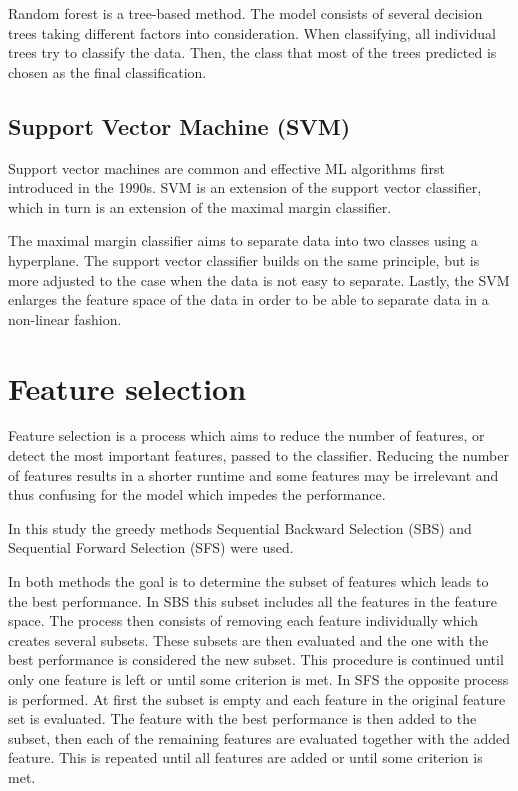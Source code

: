 \documentclass{kththesis}
\begin{document}
Random forest is a tree-based method. The model consists of several decision trees taking different factors into consideration. When classifying, all individual trees try to classify the data. Then, the class that most of the trees predicted is chosen as the final classification. \parencite{ibmrforest}


\subsection{Support Vector Machine (SVM)}

Support vector machines are common and effective ML algorithms first introduced in the 1990s. SVM is an extension of the support vector classifier, which in turn is an extension of the maximal margin classifier.

The maximal margin classifier aims to separate data into two classes using a hyperplane. The support vector classifier builds on the same principle, but is more adjusted to the case when the data is not easy to separate. Lastly, the SVM enlarges the feature space of the data in order to be able to separate data in a non-linear fashion. \parencite{james2013introduction}


\section{Feature selection}


Feature selection is a process which aims to reduce the number of features, or detect the most important features, passed to the classifier. Reducing the number of features results in a shorter runtime and some features may be irrelevant and thus confusing for the model which impedes the performance.\parencite{chaganti2022thyroid}

In this study the greedy methods Sequential Backward Selection (SBS) and Sequential Forward Selection (SFS) were used.

In both methods the goal is to determine the subset of features which leads to the best performance. In SBS this subset includes all the features in the feature space. The process then consists of removing each feature individually which creates several subsets. These subsets are then evaluated and the one with the best performance is considered the new subset. This procedure is continued until only one feature is left or until some criterion is met. In SFS the opposite process is performed. At first the subset is empty and each feature in the original feature set is evaluated. The feature with the best performance is then added to the subset, then each of the remaining features are evaluated together with the added feature. This is repeated until all features are added or until some criterion is met.\parencite{chaganti2022thyroid}
\end{document}
